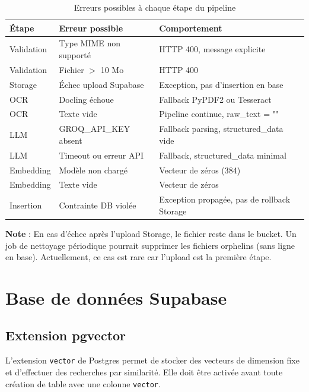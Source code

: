 \documentclass[11pt,a4paper]{report}
\begin{document}
\begin{table}[H]
  \centering
  \caption{Erreurs possibles à chaque étape du pipeline}
  \small
  \begin{tabular}{@{}lp{4cm}p{4cm}@{}}
    \toprule
    \textbf{Étape} & \textbf{Erreur possible} & \textbf{Comportement} \\
    \midrule
    Validation & Type MIME non supporté & HTTP 400, message explicite \\
    Validation & Fichier $>$ 10 Mo & HTTP 400 \\
    Storage & Échec upload Supabase & Exception, pas d'insertion en base \\
    OCR & Docling échoue & Fallback PyPDF2 ou Tesseract \\
    OCR & Texte vide & Pipeline continue, raw\_text = "" \\
    LLM & GROQ\_API\_KEY absent & Fallback parsing, structured\_data vide \\
    LLM & Timeout ou erreur API & Fallback, structured\_data minimal \\
    Embedding & Modèle non chargé & Vecteur de zéros (384) \\
    Embedding & Texte vide & Vecteur de zéros \\
    Insertion & Contrainte DB violée & Exception propagée, pas de rollback Storage \\
    \bottomrule
  \end{tabular}
\end{table}

\textbf{Note} : En cas d'échec après l'upload Storage, le fichier reste dans le bucket. Un job de nettoyage périodique pourrait supprimer les fichiers orphelins (sans ligne en base). Actuellement, ce cas est rare car l'upload est la première étape.

\chapter{Base de données Supabase}

\section{Extension pgvector}

L'extension \texttt{vector} de Postgres permet de stocker des vecteurs de dimension fixe et d'effectuer des recherches par similarité. Elle doit être activée avant toute création de table avec une colonne \texttt{vector}.
\end{document}

